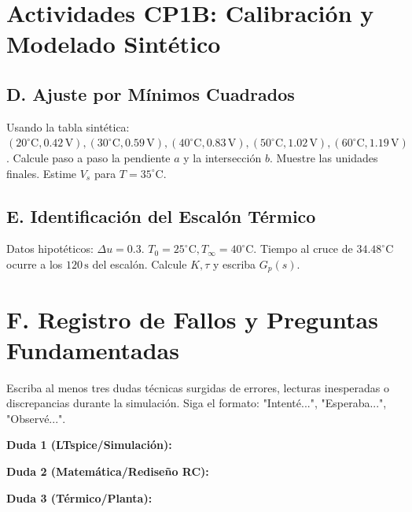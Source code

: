 \documentclass[11pt, a4paper]{article}
\begin{document}
\newpage
\section{Actividades CP1B: Calibración y Modelado Sintético}

\subsection{D. Ajuste por Mínimos Cuadrados}
Usando la tabla sintética: $(20^\circ\text{C}, 0.42\,\text{V}), (30^\circ\text{C}, 0.59\,\text{V}), (40^\circ\text{C}, 0.83\,\text{V}), (50^\circ\text{C}, 1.02\,\text{V}), (60^\circ\text{C}, 1.19\,\text{V})$.
Calcule paso a paso la pendiente $a$ y la intersección $b$. Muestre las unidades finales. Estime $V_s$ para $T = 35^\circ\text{C}$.
\vspace{5.5cm}

\subsection{E. Identificación del Escalón Térmico}
Datos hipotéticos: $\Delta u = 0.3$. $T_0 = 25^\circ\text{C}, T_\infty = 40^\circ\text{C}$. Tiempo al cruce de $34.48^\circ\text{C}$ ocurre a los $120\,\text{s}$ del escalón. Calcule $K, \tau$ y escriba $G_p(s)$.
\vspace{4.5cm}

\section{F. Registro de Fallos y Preguntas Fundamentadas}
Escriba al menos tres dudas técnicas surgidas de errores, lecturas inesperadas o discrepancias durante la simulación. Siga el formato: "Intenté...", "Esperaba...", "Observé...".

\vspace{0.5cm}
\noindent \textbf{Duda 1 (LTspice/Simulación):} \\ \vspace{2cm}

\noindent \textbf{Duda 2 (Matemática/Rediseño RC):} \\ \vspace{2cm}

\noindent \textbf{Duda 3 (Térmico/Planta):} \\ \vspace{2cm}
\end{document}
